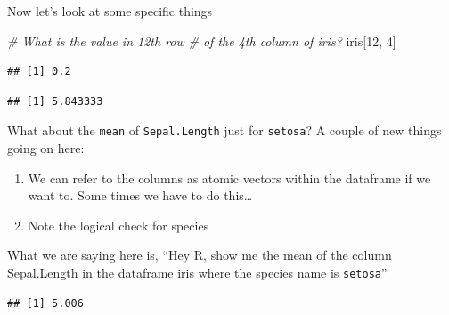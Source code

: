 \documentclass[
]{book}
\newenvironment{Shaded}{\begin{snugshade}}{\end{snugshade}}
\newcommand{\CommentTok}[1]{\textcolor[rgb]{0.56,0.35,0.01}{\textit{#1}}}
\newcommand{\DecValTok}[1]{\textcolor[rgb]{0.00,0.00,0.81}{#1}}
\newcommand{\KeywordTok}[1]{\textcolor[rgb]{0.13,0.29,0.53}{\textbf{#1}}}
\newcommand{\NormalTok}[1]{#1}
\newcommand{\OperatorTok}[1]{\textcolor[rgb]{0.81,0.36,0.00}{\textbf{#1}}}
\newcommand{\StringTok}[1]{\textcolor[rgb]{0.31,0.60,0.02}{#1}}
\begin{document}
Now let's look at some specific things

\begin{Shaded}
\begin{Highlighting}[]
\CommentTok{# What is the value in 12th row}
\CommentTok{# of the 4th column of iris?}
\NormalTok{iris[}\DecValTok{12}\NormalTok{, }\DecValTok{4}\NormalTok{]}
\end{Highlighting}
\end{Shaded}

\begin{verbatim}
## [1] 0.2
\end{verbatim}

\begin{Shaded}
\end{Shaded}

\begin{verbatim}
## [1] 5.843333
\end{verbatim}

What about the \texttt{mean} of \texttt{Sepal.Length} just for \texttt{setosa}?
A couple of new things going on here:

\begin{enumerate}
\def\labelenumi{\arabic{enumi}.}
\item
  We can refer to the columns as atomic vectors within the dataframe if we want to. Some times we have to do this\ldots{}
\item
  Note the logical check for species
\end{enumerate}

What we are saying here is, ``Hey R, show me the mean of the column Sepal.Length in the dataframe iris where the species name is \texttt{setosa}''

\begin{Shaded}
\end{Shaded}

\begin{verbatim}
## [1] 5.006
\end{verbatim}
\end{document}
